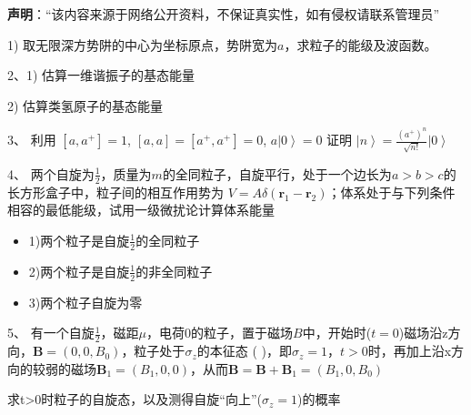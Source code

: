 
\textbf{声明}：“该内容来源于网络公开资料，不保证真实性，如有侵权请联系管理员”


1) 取无限深方势阱的中心为坐标原点，势阱宽为$a$，求粒子的能级及波函数。

2、1) 估算一维谐振子的基态能量

2) 估算类氢原子的基态能量

3、 利用 $[a,a^+]=1$, \quad $[a,a]=[a^+,a^+]=0$, \quad $a \left| 0 \right\rangle =0$ 证明 $\left| n \right\rangle = \frac{(a^+)^n}{\sqrt{n!}} \left| 0 \right\rangle$

4、 两个自旋为$\frac{1}{2}$，质量为$m$的全同粒子，自旋平行，处于一个边长为$a>b>c$的长方形盒子中，粒子间的相互作用势为 $V=A\delta (\mathbf{r}_1 - \mathbf{r}_2)$；体系处于与下列条件相容的最低能级，试用一级微扰论计算体系能量

\begin{itemize}
    \item 1)两个粒子是自旋$\frac{1}{2}$的全同粒子
    \item 2)两个粒子是自旋$\frac{1}{2}$的非全同粒子
    \item 3)两个粒子自旋为零
\end{itemize}

5、 有一个自旋$\frac{1}{2}$，磁距$\mu$，电荷0的粒子，置于磁场$B$中，开始时($t=0$)磁场沿z方向，$\mathbf{B}= \left( 0, 0, B_0 \right)$，粒子处于$\sigma_z$的本征态 (  )，即$\sigma_z = 1$，$t>0$时，再加上沿x方向的较弱的磁场$\mathbf{B}_1 = \left( B_1, 0, 0 \right)$，从而$\mathbf{B} = \mathbf{B} + \mathbf{B}_1 = \left( B_1, 0, B_0 \right)$

求t>0时粒子的自旋态，以及测得自旋“向上”($\sigma_z=1$)的概率

